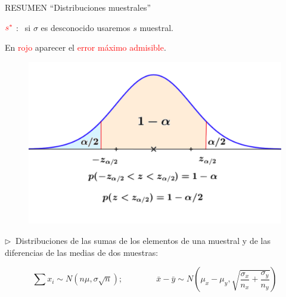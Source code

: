 \begin{myblock}{RESUMEN ``Distribuciones muestrales''}
\begin{center}
$\textcolor{red}{s^*}\ $: $\ \ $si $\sigma$ es desconocido usaremos $s$ muestral. 

 En \textcolor{red}{rojo} aparecer el \textcolor{red}{error máximo admisible}.
 
\begin{figure}[H]
	\centering
	\includegraphics[width=.7\textwidth]{imagenes/imagenes05/T05IM11.png}
	\end{figure}	
	
\vspace{5mm} $\triangleright \ $ Distribuciones de las sumas de los elementos de una muestral y de las diferencias de las medias de dos muestras:
 
$$\sum x_i \sim N(n\mu,\sigma \sqrt{n});
\qquad  \qquad 
\bar x - \bar y \sim N \left( \mu_x - \mu_y , \sqrt{\dfrac{\sigma_x}{n_x}+\dfrac{\sigma_y}{n_y}} \right) $$
\end{center}

$\quad$
\end{myblock}





